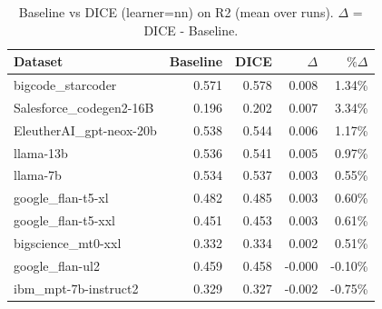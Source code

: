 \begin{table}[t]
\centering
\small
\caption{Baseline vs DICE (learner=nn) on R2 (mean over runs). $\Delta$ = DICE - Baseline.}
\label{tab:baseline-vs-dice-nn-R2}
\begin{tabular}{lrrrr}
\toprule
Dataset & Baseline & DICE & $\Delta$ & $\%\Delta$ \\
\midrule
bigcode\_starcoder & 0.571 & 0.578 & 0.008 & 1.34\% \\
Salesforce\_codegen2-16B & 0.196 & 0.202 & 0.007 & 3.34\% \\
EleutherAI\_gpt-neox-20b & 0.538 & 0.544 & 0.006 & 1.17\% \\
llama-13b & 0.536 & 0.541 & 0.005 & 0.97\% \\
llama-7b & 0.534 & 0.537 & 0.003 & 0.55\% \\
google\_flan-t5-xl & 0.482 & 0.485 & 0.003 & 0.60\% \\
google\_flan-t5-xxl & 0.451 & 0.453 & 0.003 & 0.61\% \\
bigscience\_mt0-xxl & 0.332 & 0.334 & 0.002 & 0.51\% \\
google\_flan-ul2 & 0.459 & 0.458 & -0.000 & -0.10\% \\
ibm\_mpt-7b-instruct2 & 0.329 & 0.327 & -0.002 & -0.75\% \\
\bottomrule
\end{tabular}
\end{table}